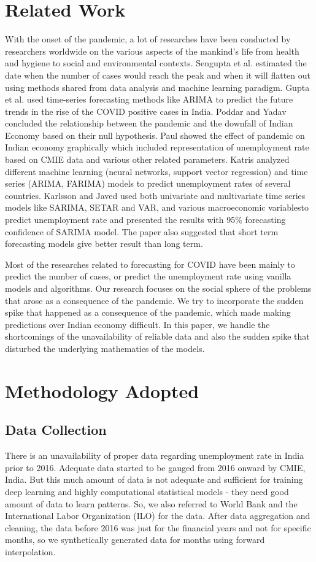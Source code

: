 \documentclass[10pt,journal,compsoc]{IEEEtran}
\begin{document}
\section{Related Work}\label{Sec_Works}
With the onset of the pandemic, a lot of researches have been conducted by researchers worldwide on the various aspects of the mankind's life from health and hygiene to social and environmental contexts. Sengupta et al. \cite{Sengupta} estimated the date when the number of cases would reach the peak and when it will flatten out using methods shared from data analysis and machine learning paradigm. Gupta et al. \cite{Gupta} used time-series forecasting methods like ARIMA to predict the future trends in the rise of the COVID positive cases in India. Poddar and Yadav \cite{Poddar} concluded the relationship between the pandemic and the downfall of Indian Economy based on their null hypothesis. Paul \cite{Paul} showed the effect of pandemic on Indian economy graphically which included representation of unemployment rate based on CMIE data and various other related parameters. Katris \cite{Katris} analyzed different machine learning (neural networks, support vector regression) and time series (ARIMA, FARIMA) models to predict unemployment rates of several countries. Karlsson and Javed \cite{Javed} used both univariate and multivariate time series models like SARIMA, SETAR and VAR, and various macroeconomic variablesto predict unemployment rate and presented the results with 95\% forecasting confidence of SARIMA model. The paper also suggested that short term forecasting models give better result than long term. 

Most of the researches related to forecasting for COVID have been mainly to predict the number of cases, or predict the unemployment rate using vanilla models and algorithms. Our research focuses on the social sphere of the problems that arose as a consequence of the pandemic. We try to incorporate the sudden spike that happened as a consequence of the pandemic, which made making predictions over Indian economy difficult. In this paper, we handle the shortcomings of the unavailability of reliable data and also the sudden spike that disturbed the underlying mathematics of the models.


\section{Methodology Adopted}\label{Sec_Tools}
\subsection{Data Collection}
There is an unavailability of proper data regarding unemployment rate in India prior to 2016. Adequate data started to be gauged from 2016 onward by CMIE, India. But this much amount of data is not adequate and sufficient for training deep learning and highly computational statistical models - they need good amount of data to learn patterns. So, we also referred to World Bank and the International Labor Organization (ILO) for the data. After data aggregation and cleaning, the data before 2016 was just for the financial years and not for specific months, so we synthetically generated data for months using forward interpolation.
\end{document}
